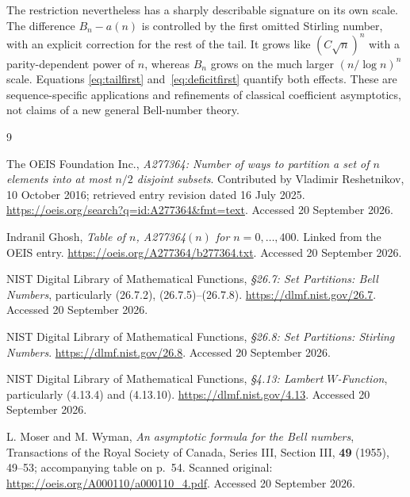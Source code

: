 \documentclass[11pt,a4paper]{article}
\numberwithin{equation}{section}
\theoremstyle{remark}
\begin{document}
The restriction nevertheless has a sharply describable signature on its
own scale. The difference $B_n-a(n)$ is controlled by the first omitted
Stirling number, with an explicit correction for the rest of the tail.
It grows like $(C\sqrt n)^n$ with a parity-dependent power of $n$, whereas
$B_n$ grows on the much larger $(n/\log n)^n$ scale. Equations
\eqref{eq:tailfirst} and~\eqref{eq:deficitfirst} quantify both effects.
These are sequence-specific applications and refinements of classical
coefficient asymptotics, not claims of a new general Bell-number theory.

\begin{thebibliography}{9}

The OEIS Foundation Inc.,
\emph{A277364: Number of ways to partition a set of $n$ elements into at
most $n/2$ disjoint subsets}.
Contributed by Vladimir Reshetnikov, 10 October 2016; retrieved entry
revision dated 16 July 2025.
\url{https://oeis.org/search?q=id:A277364&fmt=text}.
Accessed 20 September 2026.

Indranil Ghosh,
\emph{Table of $n$, A277364$(n)$ for $n=0,\ldots,400$}.
Linked from the OEIS entry.
\url{https://oeis.org/A277364/b277364.txt}.
Accessed 20 September 2026.

NIST Digital Library of Mathematical Functions,
\emph{\S26.7: Set Partitions: Bell Numbers}, particularly
(26.7.2), (26.7.5)--(26.7.8).
\url{https://dlmf.nist.gov/26.7}.
Accessed 20 September 2026.

NIST Digital Library of Mathematical Functions,
\emph{\S26.8: Set Partitions: Stirling Numbers}.
\url{https://dlmf.nist.gov/26.8}.
Accessed 20 September 2026.

NIST Digital Library of Mathematical Functions,
\emph{\S4.13: Lambert $W$-Function}, particularly (4.13.4) and (4.13.10).
\url{https://dlmf.nist.gov/4.13}.
Accessed 20 September 2026.

L. Moser and M. Wyman,
\emph{An asymptotic formula for the Bell numbers},
Transactions of the Royal Society of Canada, Series III, Section III,
\textbf{49} (1955), 49--53; accompanying table on p.~54.
Scanned original:
\url{https://oeis.org/A000110/a000110_4.pdf}.
Accessed 20 September 2026.

\end{thebibliography}
\end{document}
